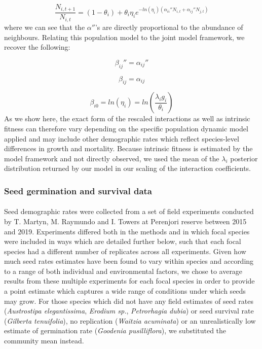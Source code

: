 \documentclass[a4,12pt]{article}
\begin{document}
        \begin{equation}
            \frac{N_{i, t+1}}{N_{i, t}} = (1 - \theta_{i}) + \theta_{i} \eta_{i} e^{-ln(\eta_{i})({\alpha_{ii}}'' N_{i, t} + {\alpha_{ij}}'' N_{j, t})}
        \end{equation}
        where we can see that the ${\alpha}''$'s are directly proportional to the abundance of neighbours. Relating this population model to the joint model framework, we recover the following: 

        \begin{equation}
        {\beta_{ij}}'' = {\alpha_{ij}}''
        \end{equation}

        \begin{equation}
        \beta_{ij} = \alpha_{ij}
        \end{equation}

        \begin{equation}
        \beta_{i0}  = ln(\eta_{i}) = ln(\frac{\lambda_{i} g_{i}}{\theta_{i}})
        \end{equation}
        As we show here, the exact form of the rescaled interactions as well as intrinsic fitness can therefore vary depending on the specific population dynamic model applied and may include other demographic rates which reflect species-level differences in growth and mortality. Because intrinsic fitness is estimated by the model framework and not directly observed, we used the mean of the $\lambda_{i}$ posterior distribution returned by our model in our scaling of the interaction coefficients.


        \subsubsection{Seed germination and survival data}
        \label{SI:germination}

        \paragraph{}
        Seed demographic rates were collected from a set of field experiments conducted by T. Martyn, M. Raymundo and I. Towers at Perenjori reserve between 2015 and 2019. Experiments differed both in the methods and in which focal species were included in ways which are detailed further below, such that each focal species had a different number of replicates across all experiments. Given how much seed rates estimates have been found to vary within species and according to a range of both individual and environmental factors, we chose to average results from these multiple experiments for each focal species in order to provide a point estimate which captures a wide range of conditions under which seeds may grow. For those species which did not have any field estimates of seed rates (\textit{Austrostipa elegantissima}, \textit{Erodium sp.}, \textit{Petrorhagia dubia}) or seed survival rate (\textit{Gilberta tenuifolia}), no replication (\textit{Waitzia acuminata}) or an unrealistically low estimate of germination rate (\textit{Goodenia pusilliflora}), we substituted the community mean instead. 
\end{document}
